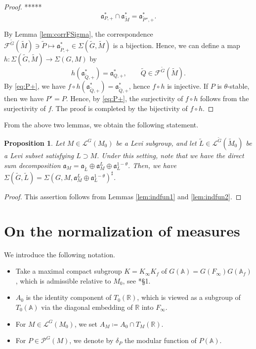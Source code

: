 \documentclass[12pt]{amsart}
\theoremstyle{definition}
\theoremstyle{plain}
\newtheorem{proposition}[definition]{Proposition}
\theoremstyle{remark}
\def\R{\mathbb{R}}%
\def\A{\mathbb{A}}%
\def\inf{\infty}
\newcommand{\fa}{\mathfrak{a}}
\newcommand{\cF}{\mathcal{F}}
\newcommand{\cL}{\mathcal{L}}
\newcommand{\cP}{\mathcal{P}}
\numberwithin{equation}{section}
\newcommand{\tG}{\widetilde{G}}
\newcommand{\tM}{\widetilde{M}}
\newcommand{\tL}{\widetilde{L}}
\newcommand{\tP}{\widetilde{P}}
\newcommand{\tQ}{\widetilde{Q}}
\begin{document}
\begin{proof}
*****
\begin{equation}\label{eq:P+}
\fa_{P,+}^*\cap\fa_{\tM}^*=\fa_{\tP'',+}^*    .
\end{equation}

By Lemma \ref{lem:corrFSigma}, the correspondence $\cF^{\tG}(\tM)\ni\tP\mapsto\fa^*_{\tP,+}\in\Sigma(\tG,\tM)$ is a bijection.
Hence, we can define a map $h\colon \Sigma(\tG,\tM)\to\Sigma(G,M)$ by
\[
h(\fa_{\tQ,+}^*)=\fa_{Q,+}^*, \qquad \tQ\in \cF^{\tG}(\tM).
\]
By \eqref{eq:P+}, we have $f\circ h(\fa_{\tQ,+}^*)=\fa_{\tQ,+}^*$, hence $f\circ h$ is injective. 
If $P$ is $\theta$-stable, then we have $P'=P$. 
Hence, by \eqref{eq:P+}, the surjectivity of $f\circ h$ follows from the surjectivity of $f$. 
The proof is completed by the bijectivity of $f\circ h$. 
\fi
\end{proof}

From the above two lemmas, we obtain the following statement.
\begin{proposition}\label{prop:indfun}
    Let $M\in\cL^G(M_0)$ be a Levi subgroup, and let $\tL\in \cL^{\tG}(\tM_0)$ be a Levi subset satisfying $L\supset M$. 
    Under this setting, note that we have the direct sum decomposition
$\fa_M=\fa_{\tL}\oplus\fa_M^L\oplus\fa_L^{1-\theta}$. 
    Then, we have $\Sigma(\tG,\tL)=\Sigma(G,M,\fa_M^L\oplus\fa_L^{1-\theta})^\sharp$.
\end{proposition}
\begin{proof}
This assertion follows from Lemmas \ref{lem:indfun1} and \ref{lem:indfun2}.
\end{proof}



\section{On the normalization of measures}\label{sec:measure}




We introduce the following notation.
\begin{itemize}
    \item Take a maximal compact subgroup $K=K_\inf K_f$ of $G(\A)=G(F_\inf)G(\A_f)$, which is admissible relative to $M_0$, see \cite{Art81}*{\S1}. 
    \item $A_0$ is the identity component of $T_0(\R)$, which is viewed as a subgroup of $T_0(\A)$ via the diagonal embedding of $\R$ into $F_\inf$. 
    \item For $M\in \cL^G(M_0)$, we set $A_M\coloneqq A_0\cap T_M(\R)$. 
    \item For $P\in\cP^G(M)$, we denote by $\delta_P$ the modular function of $P(\A)$. 
\end{itemize}
\end{document}
